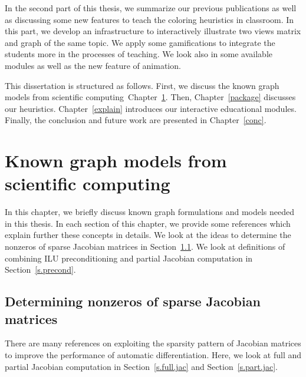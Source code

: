 \documentclass[12pt, twoside,a4paper,toc=bibliography]{scrbook}
\newcommand{\secref}[1]{Section~\protect\ref{#1}}
\newcommand{\chapref}[1]{Chapter~\protect\ref{#1}}
\begin{document}
In the second part of this thesis, we summarize our previous publications
\cite{2013:05,2014:01,2014:02,2014:09,2015:3,cscpaper} as well as discussing some new features
to teach the coloring heuristics in classroom. In this part, we develop an infrastructure
to interactively illustrate two views matrix and graph of the same topic.
We apply some gamifications to integrate the students more in the processes of teaching.
We look also in some available modules as well as the new feature of animation.

This dissertation is structured as follows.
First, we discuss the known graph models from scientific computing~\chapref{prel}.
Then, \chapref{package} discusses our heuristics.
\chapref{explain} introduces our interactive educational modules.
Finally, the conclusion and future work are presented in \chapref{conc}.

\chapter{Known graph models from scientific computing}
\label{prel}
In this chapter, we briefly discuss known graph formulations and
models needed in this thesis. In each section of this chapter,
we provide some references which explain further these concepts in details.
We look at the ideas to determine the nonzeros of sparse Jacobian matrices in
\secref{s.det.nonzero}.
We look at definitions of combining ILU preconditioning and
partial Jacobian computation in \secref{s.precond}.

\section{Determining nonzeros of sparse Jacobian matrices}
\label{s.det.nonzero}
There are many references on exploiting the sparsity pattern of Jacobian matrices
to improve the performance of automatic differentiation.
Here, we look at full and partial Jacobian computation in
\secref{s.full.jac} and \secref{s.part.jac}.
\end{document}
